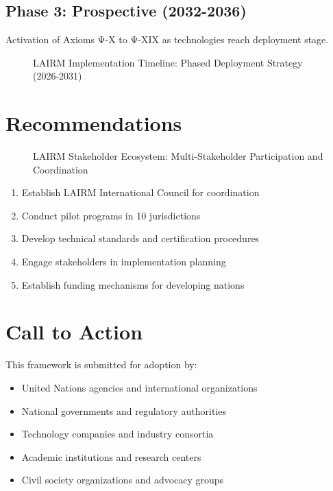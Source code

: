 \documentclass[12pt,a4paper,twoside,openright]{book}
\begin{document}
\subsection{Phase 3: Prospective (2032-2036)}

Activation of Axioms Ψ-X to Ψ-XIX as technologies reach deployment stage.

\vspace{0.5cm}

\begin{figure}[h]
\centering

\caption{LAIRM Implementation Timeline: Phased Deployment Strategy (2026-2031)}
\label{fig:implementation-timeline}
\end{figure}

\section{Recommendations}

\begin{figure}[h]
\centering

\caption{LAIRM Stakeholder Ecosystem: Multi-Stakeholder Participation and Coordination}
\label{fig:stakeholder-ecosystem}
\end{figure}

\begin{enumerate}
    \item Establish LAIRM International Council for coordination
    \item Conduct pilot programs in 10 jurisdictions
    \item Develop technical standards and certification procedures
    \item Engage stakeholders in implementation planning
    \item Establish funding mechanisms for developing nations
\end{enumerate}

\section{Call to Action}

This framework is submitted for adoption by:

\begin{itemize}
    \item United Nations agencies and international organizations
    \item National governments and regulatory authorities
    \item Technology companies and industry consortia
    \item Academic institutions and research centers
    \item Civil society organizations and advocacy groups
\end{itemize}
\end{document}
